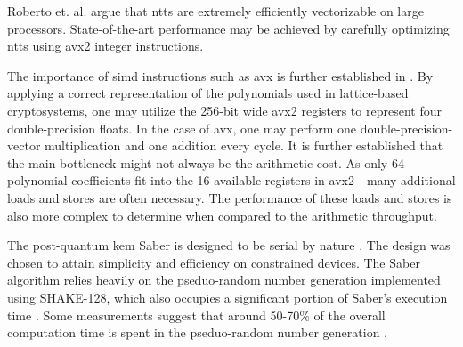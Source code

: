 Roberto et. al. \cite{kyber2021} argue that \glspl{ntt} are extremely efficiently vectorizable on large processors. State-of-the-art performance may be achieved by carefully optimizing \glspl{ntt} using \gls{avx2} integer instructions.

The importance of \gls{simd} instructions such as \gls{avx} is further established in \cite{guneysu2013}. By applying a correct representation of the polynomials used in lattice-based cryptosystems, one may utilize the 256-bit wide \gls{avx2} registers to represent four double-precision floats. In the case of \gls{avx}, one may perform one double-precision-vector multiplication and one addition every cycle. It is further established that the main bottleneck might not always be the arithmetic cost. As only 64 polynomial coefficients fit into the 16 available registers in \gls{avx2} - many additional loads and stores are often necessary. The performance of these loads and stores is also more complex to determine when compared to the arithmetic throughput.


The \gls{post-quantum} \gls{kem} Saber is designed to be serial by nature \cite{sinha2019}. The design was chosen to attain simplicity and efficiency on constrained devices. The Saber algorithm relies heavily on the pseduo-random number generation implemented using SHAKE-128, which also occupies a significant portion of Saber's execution time \cite{sinha2019}. Some measurements suggest that around 50-70\% of the overall computation time is spent in the pseduo-random number generation \cite{saber}.

